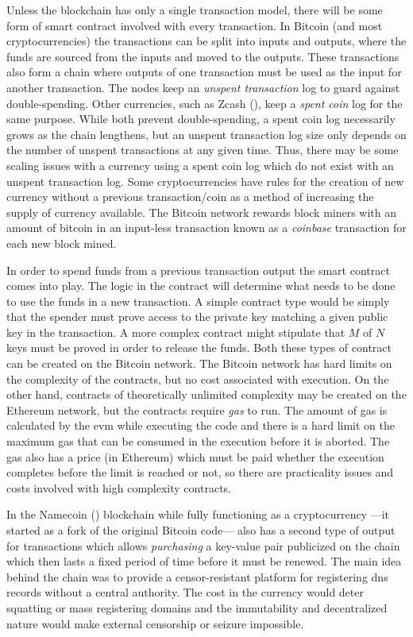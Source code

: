 Unless the blockchain has only a single transaction model, there will be some form of smart contract involved with every transaction. In Bitcoin (and most cryptocurrencies) the transactions can be split into inputs and outputs, where the funds are sourced from the inputs and moved to the outputs. These transactions also form a chain where outputs of one transaction must be used as the input for another transaction. The nodes keep an \emph{unspent transaction} log to guard against double-spending. Other currencies, such as Zcash (), keep a \emph{spent coin} log for the same purpose. While both prevent double-spending, a spent coin log necessarily grows as the chain lengthens, but an unspent transaction log size only depends on the number of unspent transactions at any given time. Thus, there may be some scaling issues with a currency using a spent coin log which do not exist with an unspent transaction log. Some cryptocurrencies have rules for the creation of new currency without a previous transaction/coin as a method of increasing the supply of currency available. The Bitcoin network rewards block miners with an amount of bitcoin in an input-less transaction known as a \emph{coinbase} transaction for each new block mined.

In order to spend funds from a previous transaction output the smart contract comes into play. The logic in the contract will determine what needs to be done to use the funds in a new transaction. A simple contract type would be simply that the spender must prove access to the private key matching a given public key in the transaction. A more complex contract might stipulate that $M$ of $N$ keys must be proved in order to release the funds. Both these types of contract can be created on the Bitcoin network. The Bitcoin network has hard limits on the complexity of the contracts, but no cost associated with execution. On the other hand, contracts of theoretically unlimited complexity may be created on the Ethereum network, but the contracts require \emph{gas} to run. The amount of gas is calculated by the \gls{evm} while executing the code and there is a hard limit on the maximum gas that can be consumed in the execution before it is aborted. The gas also has a price (in Ethereum) which must be paid whether the execution completes before the limit is reached or not, so there are practicality issues and costs involved with high complexity contracts.

In the Namecoin () blockchain while fully functioning as a cryptocurrency ---it started as a fork of the original Bitcoin code--- also has a second type of output for transactions which allows \emph{purchasing} a key-value pair publicized on the chain which then lasts a fixed period of time before it must be renewed. The main idea behind the chain was to provide a censor-resistant platform for registering \gls{dns} records without a central authority. The cost in the currency would deter squatting or mass registering domains and the immutability and decentralized nature would make external censorship or seizure impossible.

